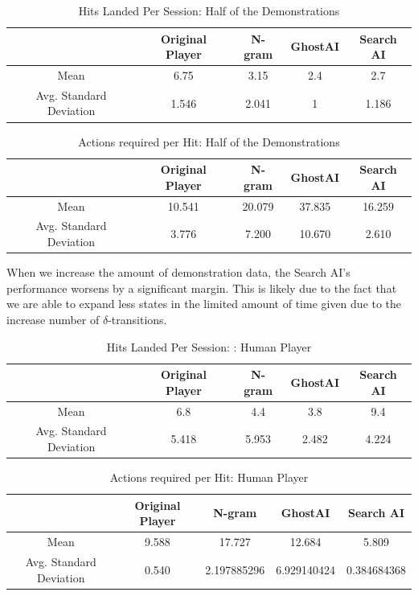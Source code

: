 \begin{table}[h]
	\centering
	\caption{Hits Landed Per Session:  Half of the Demonstrations }
	\begin{tabular}	{| c | c | c | c | c | }
		\hline
		& Original Player & N-gram & GhostAI & Search AI \\
		\hline
		Mean &
		6.75&
		3.15&
		2.4&
		2.7\\
		\hline
		Avg. Standard Deviation &
		1.546&
		2.041&
		1&
		1.186\\
		\hline
	\end{tabular}
	\label{Effectiveness1}
\end{table}
\begin{table}[h]
	\centering
	\caption{Actions required per Hit:  Half of the Demonstrations }
	\begin{tabular}	{| c | c | c | c | c | }
		\hline
		& Original Player & N-gram & GhostAI & Search AI \\
		\hline
		Mean &
		10.541&
		20.079&
		37.835&
		16.259\\
		\hline
		Avg. Standard Deviation &
		3.776&
		7.200&
		10.670&
		2.610\\
		\hline
	\end{tabular}
	\label{Effectiveness2}
\end{table}

When we increase the amount of demonstration data, the Search AI's performance worsens by a significant margin. This is likely due to the fact that we are able to expand less states in the limited amount of time given due to the increase number of $\delta$-transitions.

\begin{table}[h]
	\centering
	\caption{Hits Landed Per Session: : Human Player}
	\begin{tabular}	{| c | c | c | c | c | }
		\hline
		& Original Player & N-gram & GhostAI & Search AI \\
		\hline
		Mean &
		6.8&
		4.4&
		3.8&
		9.4\\
		\hline
		Avg. Standard Deviation &
		5.418&
		5.953&
		2.482&
		4.224\\
		\hline
	\end{tabular}
	\label{Effectiveness1}
\end{table}


\begin{table}[h]
	\centering
	\caption{Actions required per Hit: Human Player}
	\begin{tabular}	{| c | c | c | c | c | }
		\hline
		& Original Player & N-gram & GhostAI & Search AI \\
		\hline
		Mean &
		9.588&
		17.727&
		12.684&
		5.809\\
		\hline
		Avg. Standard Deviation &
		0.540 &
		2.197885296&
		6.929140424&
		0.384684368\\
		\hline
	\end{tabular}
	\label{Effectiveness2}
\end{table}

